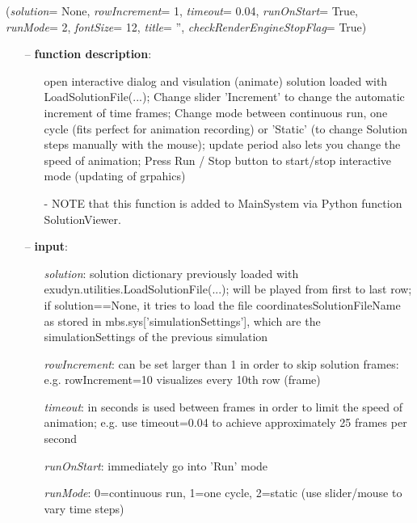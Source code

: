 \begin{flushleft}
\label{sec:mainsystemextensions:SolutionViewer}
({\it solution}= None, {\it rowIncrement}= 1, {\it timeout}= 0.04, {\it runOnStart}= True, {\it runMode}= 2, {\it fontSize}= 12, {\it title}= '', {\it checkRenderEngineStopFlag}= True)
\end{flushleft}
\setlength{\itemindent}{0.7cm}
\begin{itemize}[leftmargin=0.7cm]
\item[--]
{\bf function description}: \vspace{-6pt}
\begin{itemize}[leftmargin=1.2cm]
\setlength{\itemindent}{-0.7cm}
\item[]open interactive dialog and visulation (animate) solution loaded with LoadSolutionFile(...); Change slider 'Increment' to change the automatic increment of time frames; Change mode between continuous run, one cycle (fits perfect for animation recording) or 'Static' (to change Solution steps manually with the mouse); update period also lets you change the speed of animation; Press Run / Stop button to start/stop interactive mode (updating of grpahics)
\item[]- NOTE that this function is added to MainSystem via Python function SolutionViewer.
\end{itemize}
\item[--]
{\bf input}: \vspace{-6pt}
\begin{itemize}[leftmargin=1.2cm]
\setlength{\itemindent}{-0.7cm}
\item[]{\it solution}: solution dictionary previously loaded with exudyn.utilities.LoadSolutionFile(...); will be played from first to last row; if solution==None, it tries to load the file coordinatesSolutionFileName as stored in mbs.sys['simulationSettings'], which are the simulationSettings of the previous simulation
\item[]{\it rowIncrement}: can be set larger than 1 in order to skip solution frames: e.g. rowIncrement=10 visualizes every 10th row (frame)
\item[]{\it timeout}: in seconds is used between frames in order to limit the speed of animation; e.g. use timeout=0.04 to achieve approximately 25 frames per second
\item[]{\it runOnStart}: immediately go into 'Run' mode
\item[]{\it runMode}: 0=continuous run, 1=one cycle, 2=static (use slider/mouse to vary time steps)

\end{itemize}
\end{itemize}
